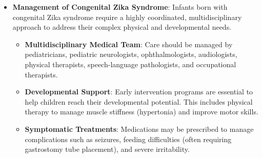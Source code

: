 \begin{itemize}
\item \textbf{Management of Congenital Zika Syndrome}: Infants born with congenital Zika syndrome require a highly coordinated, multidisciplinary approach to address their complex physical and developmental needs.
  \begin{itemize}
  \item \textbf{Multidisciplinary Medical Team}: Care should be managed by pediatricians, pediatric neurologists, ophthalmologists, audiologists, physical therapists, speech-language pathologists, and occupational therapists.
  \item \textbf{Developmental Support}: Early intervention programs are essential to help children reach their developmental potential. This includes physical therapy to manage muscle stiffness (hypertonia) and improve motor skills.
  \item \textbf{Symptomatic Treatments}: Medications may be prescribed to manage complications such as seizures, feeding difficulties (often requiring gastrostomy tube placement), and severe irritability.
  \end{itemize}
\end{itemize}

